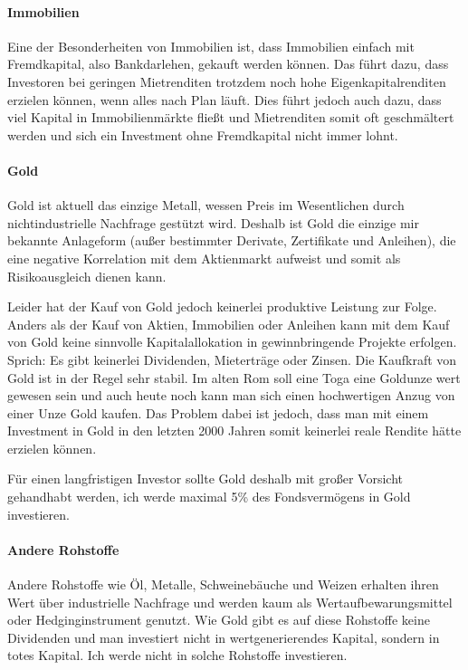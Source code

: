 \documentclass{article}
\begin{document}
\paragraph{Immobilien}

Eine der Besonderheiten von Immobilien ist, dass Immobilien einfach mit Fremdkapital, also Bankdarlehen, gekauft werden können. Das führt dazu, dass Investoren bei geringen Mietrenditen trotzdem noch hohe Eigenkapitalrenditen erzielen können, wenn alles nach Plan läuft. Dies führt jedoch auch dazu, dass viel Kapital in Immobilienmärkte fließt und Mietrenditen somit oft geschmältert werden und sich ein Investment ohne Fremdkapital nicht immer lohnt. 

\paragraph{Gold}

Gold ist aktuell das einzige Metall, wessen Preis im Wesentlichen durch nichtindustrielle Nachfrage gestützt wird. Deshalb ist Gold die einzige mir bekannte Anlageform (außer bestimmter Derivate, Zertifikate und Anleihen), die eine negative Korrelation mit dem Aktienmarkt aufweist und somit als Risikoausgleich dienen kann.

Leider hat der Kauf von Gold jedoch keinerlei produktive Leistung zur Folge. Anders als der Kauf von Aktien, Immobilien oder Anleihen kann mit dem Kauf von Gold keine sinnvolle Kapitalallokation in gewinnbringende Projekte erfolgen. Sprich: Es gibt keinerlei Dividenden, Mieterträge oder Zinsen. Die Kaufkraft von Gold ist in der Regel sehr stabil. Im alten Rom soll eine Toga eine Goldunze wert gewesen sein und auch heute noch kann man sich einen hochwertigen Anzug von einer Unze Gold kaufen. Das Problem dabei ist jedoch, dass man mit einem Investment in Gold in den letzten 2000 Jahren somit keinerlei reale Rendite hätte erzielen können.

Für einen langfristigen Investor sollte Gold deshalb mit großer Vorsicht gehandhabt werden, ich werde maximal 5\% des Fondsvermögens in Gold investieren.

\paragraph{Andere Rohstoffe}

Andere Rohstoffe wie Öl, Metalle, Schweinebäuche und Weizen erhalten ihren Wert über industrielle Nachfrage und werden kaum als Wertaufbewarungsmittel oder Hedginginstrument genutzt. Wie Gold gibt es auf diese Rohstoffe keine Dividenden und man investiert nicht in wertgenerierendes Kapital, sondern in totes Kapital. Ich werde nicht in solche Rohstoffe investieren. 
\end{document}
